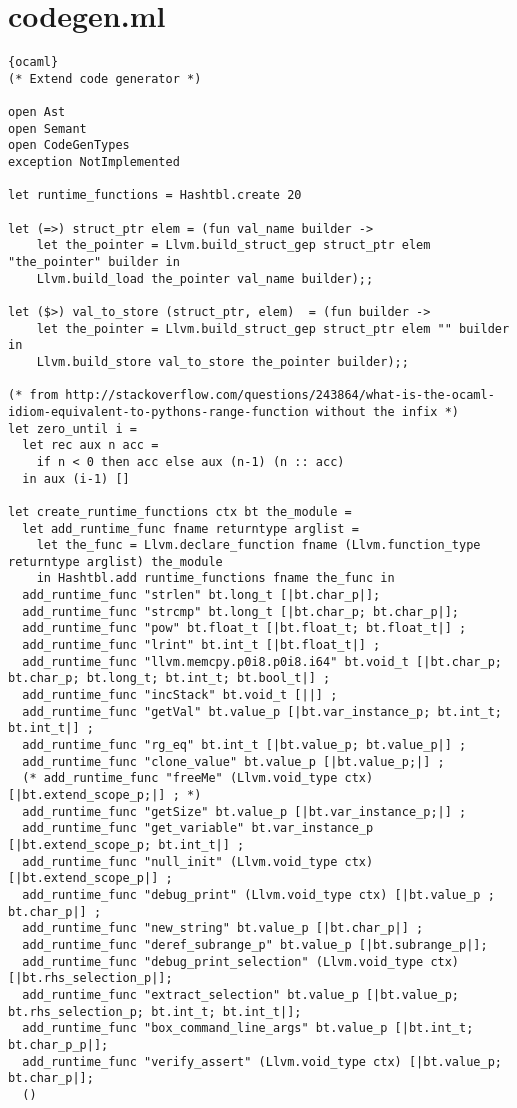 \section{codegen.ml}
\begin{lstlisting}{ocaml}
(* Extend code generator *)

open Ast
open Semant
open CodeGenTypes
exception NotImplemented

let runtime_functions = Hashtbl.create 20

let (=>) struct_ptr elem = (fun val_name builder ->
    let the_pointer = Llvm.build_struct_gep struct_ptr elem "the_pointer" builder in
    Llvm.build_load the_pointer val_name builder);;

let ($>) val_to_store (struct_ptr, elem)  = (fun builder ->
    let the_pointer = Llvm.build_struct_gep struct_ptr elem "" builder in
    Llvm.build_store val_to_store the_pointer builder);;

(* from http://stackoverflow.com/questions/243864/what-is-the-ocaml-idiom-equivalent-to-pythons-range-function without the infix *)
let zero_until i =
  let rec aux n acc =
    if n < 0 then acc else aux (n-1) (n :: acc)
  in aux (i-1) []

let create_runtime_functions ctx bt the_module =
  let add_runtime_func fname returntype arglist =
    let the_func = Llvm.declare_function fname (Llvm.function_type returntype arglist) the_module
    in Hashtbl.add runtime_functions fname the_func in
  add_runtime_func "strlen" bt.long_t [|bt.char_p|];
  add_runtime_func "strcmp" bt.long_t [|bt.char_p; bt.char_p|];
  add_runtime_func "pow" bt.float_t [|bt.float_t; bt.float_t|] ;
  add_runtime_func "lrint" bt.int_t [|bt.float_t|] ;
  add_runtime_func "llvm.memcpy.p0i8.p0i8.i64" bt.void_t [|bt.char_p; bt.char_p; bt.long_t; bt.int_t; bt.bool_t|] ;
  add_runtime_func "incStack" bt.void_t [||] ;
  add_runtime_func "getVal" bt.value_p [|bt.var_instance_p; bt.int_t; bt.int_t|] ;
  add_runtime_func "rg_eq" bt.int_t [|bt.value_p; bt.value_p|] ;
  add_runtime_func "clone_value" bt.value_p [|bt.value_p;|] ;
  (* add_runtime_func "freeMe" (Llvm.void_type ctx) [|bt.extend_scope_p;|] ; *)
  add_runtime_func "getSize" bt.value_p [|bt.var_instance_p;|] ;
  add_runtime_func "get_variable" bt.var_instance_p [|bt.extend_scope_p; bt.int_t|] ;
  add_runtime_func "null_init" (Llvm.void_type ctx) [|bt.extend_scope_p|] ;
  add_runtime_func "debug_print" (Llvm.void_type ctx) [|bt.value_p ; bt.char_p|] ;
  add_runtime_func "new_string" bt.value_p [|bt.char_p|] ;
  add_runtime_func "deref_subrange_p" bt.value_p [|bt.subrange_p|];
  add_runtime_func "debug_print_selection" (Llvm.void_type ctx) [|bt.rhs_selection_p|];
  add_runtime_func "extract_selection" bt.value_p [|bt.value_p; bt.rhs_selection_p; bt.int_t; bt.int_t|];
  add_runtime_func "box_command_line_args" bt.value_p [|bt.int_t; bt.char_p_p|];
  add_runtime_func "verify_assert" (Llvm.void_type ctx) [|bt.value_p; bt.char_p|];
  ()


\end{lstlisting}
